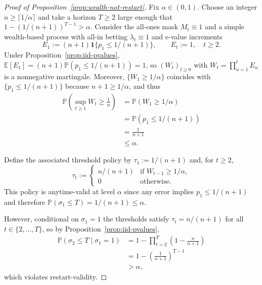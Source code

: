 \documentclass{uai2026} %
\newcommand{\1}{\mathbf{1}}
\newcommand{\ind}[1]{\mathbf{1}\{#1\}}
\newcommand{\prob}{\mathbb{P}}
\newcommand{\expec}{\mathbb{E}}
\begin{document}
\begin{proof}[Proof of Proposition~\ref{prop:wealth-not-restart}]
  Fix $\alpha\in(0,1)$.
  Choose an integer $n\ge \lceil 1/\alpha\rceil$ and take a horizon $T\ge 2$ large enough that $1-(1/(n+1))^{T-1}>\alpha$.
  Consider the all-ones mask $M_t\equiv 1$ and a simple wealth-based process with all-in betting $\lambda_t\equiv 1$ and e-value increments
  \begin{equation*}
    E_1 := (n+1)\ind{p_1\le 1/(n+1)},
    \qquad
    E_t := 1,\quad t\ge 2.
  \end{equation*}
  Under Proposition~\ref{prop:iid-pvalues}, $\expec[E_1]=(n+1)\prob(p_1\le 1/(n+1))=1$, so $(W_t)_{t\ge 0}$ with $W_t=\prod_{u=1}^{t}E_u$ is a nonnegative martingale.
  Moreover, $\{W_1\ge 1/\alpha\}$ coincides with $\{p_1\le 1/(n+1)\}$ because $n+1\ge 1/\alpha$, and thus
  \begin{equation*}
    \begin{aligned}
      \prob\left(\sup_{t\ge 1} W_t \ge \frac{1}{\alpha}\right)
      &= \prob(W_1\ge 1/\alpha)\\
      &= \prob(p_1\le 1/(n+1))\\
      &= \frac{1}{n+1}\\
      &\le \alpha.
    \end{aligned}
  \end{equation*}

  Define the associated threshold policy by $\tau_1:=1/(n+1)$ and, for $t\ge 2$,
  \begin{equation*}
    \tau_t :=
    \begin{cases}
      n/(n+1) & \text{if } W_{t-1}\ge 1/\alpha,\\
      0 & \text{otherwise.}
    \end{cases}
  \end{equation*}
  This policy is anytime-valid at level $\alpha$ since any error implies $p_1\le 1/(n+1)$ and therefore
  $\prob(\sigma_1\le T)=1/(n+1)\le \alpha$.

  However, conditional on $\sigma_1=1$ the thresholds satisfy $\tau_t=n/(n+1)$ for all $t\in\{2,\dots,T\}$, so by Proposition~\ref{prop:iid-pvalues},
  \begin{equation*}
    \begin{aligned}
      \prob(\sigma_2\le T\mid \sigma_1=1)
      &= 1-\prod_{t=2}^{T}\left(1-\frac{n}{n+1}\right)\\
      &= 1-\left(\frac{1}{n+1}\right)^{T-1}\\
      &> \alpha,
    \end{aligned}
  \end{equation*}
  which violates restart-validity.
\end{proof}\par\medskip
\end{document}

